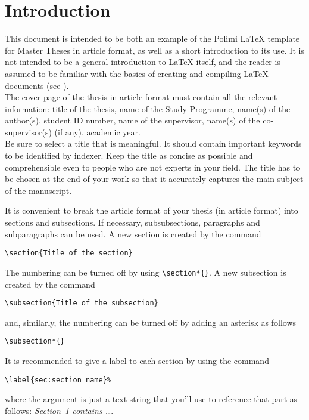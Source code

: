 \section{Introduction}
\label{sec:introduction}
This document is intended to be both an example of the Polimi \LaTeX{} template for Master Theses in article format,
as well as a short introduction to its use. It is not intended to be a general introduction to \LaTeX{} itself,
and the reader is assumed to be familiar with the basics of creating and compiling \LaTeX{} documents (see \cite{oetiker1995not, kottwitz2015latex}). 
\\
The cover page of the thesis in article format must contain all the relevant information:
title of the thesis, name of the Study Programme, name(s) of the author(s),
student ID number, name of the supervisor, name(s) of the co-supervisor(s) (if any), academic year.
\\
Be sure to select a title that is meaningful.
It should contain important keywords to be identified by indexer.
Keep the title as concise as possible and comprehensible even to people who are not experts in your field.
The title has to be chosen at the end of your work so that it accurately captures the main subject of the manuscript.

It is convenient to break the article format of your thesis (in article format) into sections and subsections. 
If necessary, subsubsections, paragraphs and subparagraphs can be used. 
A new section is created by the command
\begin{verbatim}
\section{Title of the section}
\end{verbatim}
The numbering can be turned off by using \verb|\section*{}|.
A new subsection is created by the command
\begin{verbatim}
\subsection{Title of the subsection}
\end{verbatim}
and, similarly, the numbering can be turned off by adding an asterisk as follows 
\begin{verbatim}
\subsection*{}
\end{verbatim}
It is recommended to give a label to each section by using the command
\begin{verbatim}
\label{sec:section_name}%
\end{verbatim}
where the argument is just a text string that you'll use to reference that part
as follows: \textit{Section~\ref{sec:introduction} contains   \dots}.

